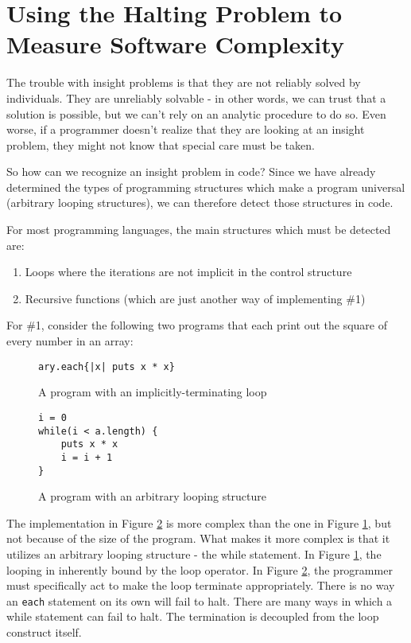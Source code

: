 \section{Using the Halting Problem to Measure Software Complexity}

The trouble with insight problems is that they are not reliably solved by individuals.  They are unreliably solvable - in other words, we can trust that a solution is possible, but we can’t rely on an analytic procedure to do so.  Even worse, if a programmer doesn’t realize that they are looking at an insight problem, they might not know that special care must be taken.

So how can we recognize an insight problem in code?  Since we have already determined the types of programming structures which make a program universal (arbitrary looping structures), we can therefore detect those structures in code.

For most programming languages, the main structures which must be detected are:

\begin{enumerate}
\item Loops where the iterations are not implicit in the control structure
\item Recursive functions (which are just another way of implementing \#1)
\end{enumerate}

For \#1, consider the following two programs that each print out the square of every number in an array:

\begin{figure}[H]
\begin{verbatim}
ary.each{|x| puts x * x}
\end{verbatim}
\caption{A program with an implicitly-terminating loop}
\label{fig:impterm}
\end{figure}

\begin{figure}[H]
\begin{verbatim}
i = 0
while(i < a.length) {
	puts x * x
	i = i + 1
}
\end{verbatim}
\caption{A program with an arbitrary looping structure}
\label{fig:expterm}
\end{figure}

The implementation in Figure \ref{fig:expterm} is more complex than the one in Figure \ref{fig:impterm}, but not because of the size of the program.  What makes it more complex is that it utilizes an arbitrary looping structure - the while statement.  In Figure \ref{fig:impterm}, the looping in inherently bound by the loop operator.  In Figure \ref{fig:expterm}, the programmer must specifically act to make the loop terminate appropriately.  There is no way an \verb+each+ statement on its own will fail to halt.  There are many ways in which a while statement can fail to halt.  The termination is decoupled from the loop construct itself.

